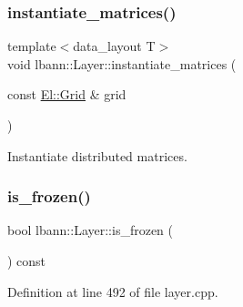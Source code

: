 \subsubsection{\texorpdfstring{instantiate\+\_\+matrices()}{instantiate\_matrices()}}
{\footnotesize\ttfamily template$<$data\+\_\+layout T$>$ \\
void lbann\+::\+Layer\+::instantiate\+\_\+matrices (\begin{DoxyParamCaption}\item[{const \hyperlink{base_8hpp_a9951bb1719d534e0401b1f06cad19eab}{El\+::\+Grid} \&}]{grid }\end{DoxyParamCaption})\hspace{0.3cm}{\ttfamily [private]}}

Instantiate distributed matrices. \mbox{\label{classlbann_1_1Layer_af3c0f9f32eb631f4fdf34ad040ef8637}} 
\subsubsection{\texorpdfstring{is\+\_\+frozen()}{is\_frozen()}}
{\footnotesize\ttfamily bool lbann\+::\+Layer\+::is\+\_\+frozen (\begin{DoxyParamCaption}{ }\end{DoxyParamCaption}) const}



Definition at line 492 of file layer.\+cpp.


